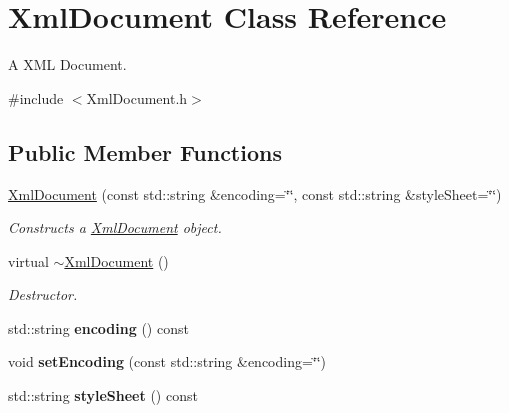 \hypertarget{class_xml_document}{\section{Xml\-Document Class Reference}
\label{class_xml_document}
}


A X\-M\-L Document.  




{\ttfamily \#include $<$Xml\-Document.\-h$>$}

\subsection*{Public Member Functions}
\begin{DoxyCompactItemize}
\item 
\hyperlink{class_xml_document_a3bc4c5ea5f22b4ff8776422125b31d42}{Xml\-Document} (const std\-::string \&encoding=\char`\"{}\char`\"{}, const std\-::string \&style\-Sheet=\char`\"{}\char`\"{})
\begin{DoxyCompactList}\small\item\em Constructs a \hyperlink{class_xml_document}{Xml\-Document} object. \end{DoxyCompactList}\item 
\hypertarget{class_xml_document_a5c95c959091f1ae826b8698ba0c3416c}{virtual \hyperlink{class_xml_document_a5c95c959091f1ae826b8698ba0c3416c}{$\sim$\-Xml\-Document} ()}\label{class_xml_document_a5c95c959091f1ae826b8698ba0c3416c}

\begin{DoxyCompactList}\small\item\em Destructor. \end{DoxyCompactList}\item 
\hypertarget{class_xml_document_a5063b9dc310ed5ed7a38b77f8584a50c}{std\-::string {\bfseries encoding} () const }\label{class_xml_document_a5063b9dc310ed5ed7a38b77f8584a50c}

\item 
\hypertarget{class_xml_document_afb4401e77f67626533ba7409a011c508}{void {\bfseries set\-Encoding} (const std\-::string \&encoding=\char`\"{}\char`\"{})}\label{class_xml_document_afb4401e77f67626533ba7409a011c508}

\item 
\hypertarget{class_xml_document_ae0a7e5e1f28b179c31bee66481b18c03}{std\-::string {\bfseries style\-Sheet} () const }\label{class_xml_document_ae0a7e5e1f28b179c31bee66481b18c03}


\end{DoxyCompactItemize}
